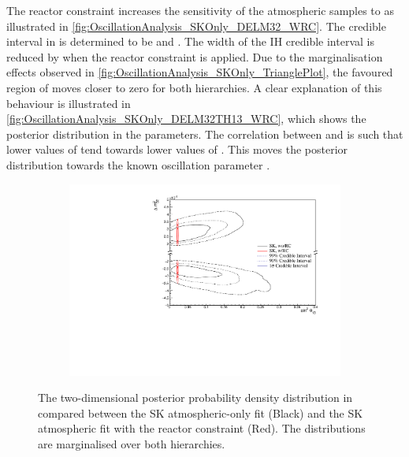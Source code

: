 The reactor constraint increases the sensitivity of the atmospheric samples to  as illustrated in \autoref{fig:OscillationAnalysis_SKOnly_DELM32_WRC}. The \quickmath{1\sigma} credible interval in  is determined to be  and . The width of the IH credible interval is reduced by  when the reactor constraint is applied. Due to the marginalisation effects observed in \autoref{fig:OscillationAnalysis_SKOnly_TrianglePlot}, the favoured region of  moves closer to zero for both hierarchies. A clear explanation of this behaviour is illustrated in \autoref{fig:OscillationAnalysis_SKOnly_DELM32TH13_WRC}, which shows the posterior distribution in the  parameters. The correlation between  and  is such that lower values of  tend towards lower values of . This moves the posterior distribution towards the known oscillation parameter .

\begin{figure}[h]
  \begin{subfigure}[t]{0.98\textwidth}
    \includegraphics[width=\textwidth, trim={0mm 0mm 0mm 0mm}, clip,page=1]{Figures/OA/SKOnlyFit_wRC/ContourComparison_2D_th13_dm32_BH_0_wRC_woRC_UnSmeared_CredibleInterval.pdf}
  \end{subfigure}
    \caption{The two-dimensional posterior probability density distribution in  compared between the SK atmospheric-only fit (Black) and the SK atmospheric fit with the reactor constraint (Red). The distributions are marginalised over both hierarchies.}
  \label{fig:OscillationAnalysis_SKOnly_DELM32TH13_WRC}
\end{figure}

